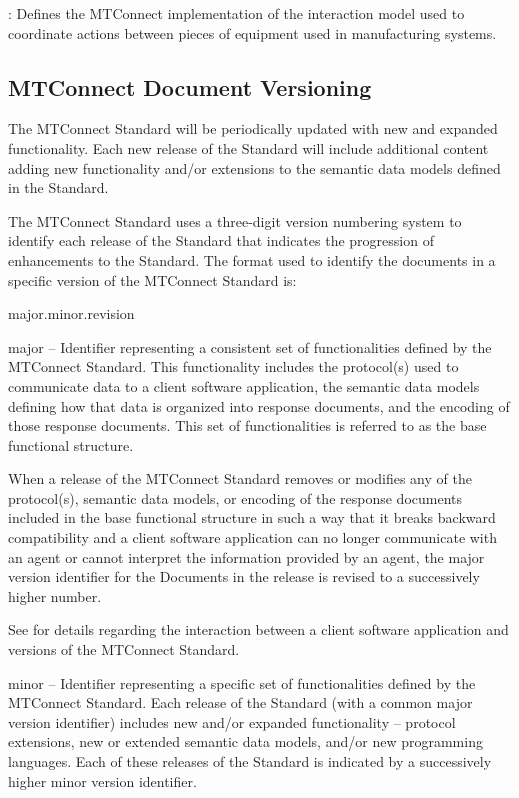 :  Defines the MTConnect implementation of the \gls{interaction model} used to coordinate actions between pieces of equipment used in manufacturing systems.   

\subsection{MTConnect Document Versioning}

The MTConnect Standard will be periodically updated with new and expanded functionality.  Each new release of the Standard will include additional content adding new functionality and/or extensions to the \glspl{semantic data model} defined in the Standard.

The MTConnect Standard uses a three-digit version numbering system to identify each release of the Standard that indicates the progression of enhancements to the Standard.  The format used to identify the documents in a specific version of the MTConnect Standard is:

\gls{major}.\gls{minor}.\gls{revision}

\gls{major} --  Identifier representing a consistent set of functionalities defined by the MTConnect Standard. This functionality includes the protocol(s) used to communicate data to a client software application, the \glspl{semantic data model} defining how that data is organized into \glspl{response document}, and the encoding of those \glspl{response document}.  This set of functionalities is referred to as the \gls{base functional structure}.

When a release of the MTConnect Standard removes or modifies any of the protocol(s), \glspl{semantic data model}, or encoding of the \glspl{response document} included in the \gls{base functional structure} in such a way that it breaks backward compatibility and a client software application can no longer communicate with an \gls{agent} or cannot interpret the information provided by an \gls{agent}, the \gls{major} version identifier for the Documents in the release is revised to a successively higher number.

See  for details regarding the interaction between a client software application and versions of the MTConnect Standard.

\gls{minor} -- Identifier representing a specific set of functionalities defined by the MTConnect Standard.  Each release of the Standard (with a common \gls{major} version identifier) includes new and/or expanded functionality -- protocol extensions, new or extended \glspl{semantic data model}, and/or new programming languages.  Each of these releases of the Standard is indicated by a successively higher \gls{minor} version identifier.   

